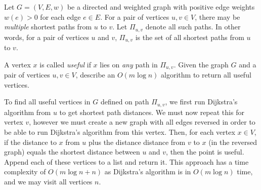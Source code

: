 \documentclass{article}
\begin{document}
\begin{question}
Let $G = (V, E, w)$ be a directed and weighted graph with positive edge weights $w(e) > 0$ for each edge $e \in E$. For a pair of vertices $u, v \in V$, there may be {\em multiple} shortest paths from $u$ to $v$. Let $\Pi_{u, v}$ denote all such paths. In other words, for a pair of vertices $u$ and $v$, $\Pi_{u, v}$ is the set of all shortest paths from $u$ to $v$.

A vertex $x$ is called {\em useful} if $x$ lies on {\em any} path in $\Pi_{u, v}$. Given the graph $G$ and a pair of vertices $u, v \in V$, describe an $O(m \log n)$ algorithm to return all useful vertices.
\end{question}

\begin{solution}
To find all useful vertices in $G$ defined on path $\Pi_{u,v}$, we first run Dijkstra's algorithm from $u$ to get shortest path distances. We must now repeat this for vertex $v$, however we must create a new graph with all edges reversed in order to be able to run Dijkstra's algorithm from this vertex. Then, for each vertex $x \in V$, if the distance to $x$ from $u$ plus the distance distance from $v$ to $x$ (in the reversed graph) equals the shortest distance between $u$ and $v$, then the point is useful. Append each of these vertices to a list and return it. This approach has a time complexity of $O(m \log n + n)$ as Dijkstra's algorithm is in $O(m \log n)$ time, and we may visit all vertices $n$.
\end{solution}
\end{document}
